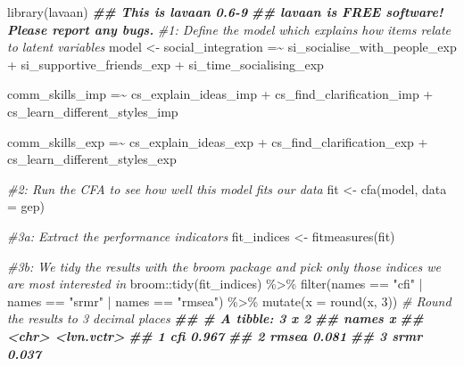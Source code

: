 \documentclass[
]{book}
\newenvironment{Shaded}{\begin{snugshade}}{\end{snugshade}}
\newcommand{\AttributeTok}[1]{\textcolor[rgb]{0.77,0.63,0.00}{#1}}
\newcommand{\CommentTok}[1]{\textcolor[rgb]{0.56,0.35,0.01}{\textit{#1}}}
\newcommand{\DecValTok}[1]{\textcolor[rgb]{0.00,0.00,0.81}{#1}}
\newcommand{\DocumentationTok}[1]{\textcolor[rgb]{0.56,0.35,0.01}{\textbf{\textit{#1}}}}
\newcommand{\FunctionTok}[1]{\textcolor[rgb]{0.00,0.00,0.00}{#1}}
\newcommand{\NormalTok}[1]{#1}
\newcommand{\OtherTok}[1]{\textcolor[rgb]{0.56,0.35,0.01}{#1}}
\newcommand{\SpecialCharTok}[1]{\textcolor[rgb]{0.00,0.00,0.00}{#1}}
\newcommand{\StringTok}[1]{\textcolor[rgb]{0.31,0.60,0.02}{#1}}
\begin{document}
\begin{Shaded}
\begin{Highlighting}[]
\FunctionTok{library}\NormalTok{(lavaan)}
\DocumentationTok{\#\# This is lavaan 0.6{-}9}
\DocumentationTok{\#\# lavaan is FREE software! Please report any bugs.}
\CommentTok{\#1: Define the model which explains how items relate to latent variables}
\NormalTok{model }\OtherTok{\textless{}{-}} \StringTok{\textquotesingle{}}
\StringTok{social\_integration =\textasciitilde{}}
\StringTok{si\_socialise\_with\_people\_exp +}
\StringTok{si\_supportive\_friends\_exp +}
\StringTok{si\_time\_socialising\_exp}

\StringTok{comm\_skills\_imp =\textasciitilde{}}
\StringTok{cs\_explain\_ideas\_imp +}
\StringTok{cs\_find\_clarification\_imp +}
\StringTok{cs\_learn\_different\_styles\_imp}

\StringTok{comm\_skills\_exp =\textasciitilde{}}
\StringTok{cs\_explain\_ideas\_exp +}
\StringTok{cs\_find\_clarification\_exp +}
\StringTok{cs\_learn\_different\_styles\_exp}
\StringTok{\textquotesingle{}}

\CommentTok{\#2: Run the CFA to see how well this model fits our data}
\NormalTok{fit }\OtherTok{\textless{}{-}} \FunctionTok{cfa}\NormalTok{(model, }\AttributeTok{data =}\NormalTok{ gep)}

\CommentTok{\#3a: Extract the performance indicators}
\NormalTok{fit\_indices }\OtherTok{\textless{}{-}} \FunctionTok{fitmeasures}\NormalTok{(fit)}

\CommentTok{\#3b: We tidy the results with the \textquotesingle{}broom\textquotesingle{} package and pick only those indices we are most interested in}
\NormalTok{broom}\SpecialCharTok{::}\FunctionTok{tidy}\NormalTok{(fit\_indices) }\SpecialCharTok{\%\textgreater{}\%}
  \FunctionTok{filter}\NormalTok{(names }\SpecialCharTok{==} \StringTok{"cfi"} \SpecialCharTok{|} 
\NormalTok{         names }\SpecialCharTok{==} \StringTok{"srmr"} \SpecialCharTok{|}
\NormalTok{         names }\SpecialCharTok{==} \StringTok{"rmsea"}\NormalTok{) }\SpecialCharTok{\%\textgreater{}\%} 
  \FunctionTok{mutate}\NormalTok{(}\AttributeTok{x =} \FunctionTok{round}\NormalTok{(x, }\DecValTok{3}\NormalTok{))         }\CommentTok{\# Round the results to 3 decimal places}
\DocumentationTok{\#\# \# A tibble: 3 x 2}
\DocumentationTok{\#\#   names x         }
\DocumentationTok{\#\#   \textless{}chr\textgreater{} \textless{}lvn.vctr\textgreater{}}
\DocumentationTok{\#\# 1 cfi   0.967     }
\DocumentationTok{\#\# 2 rmsea 0.081     }
\DocumentationTok{\#\# 3 srmr  0.037}
\end{Highlighting}
\end{Shaded}
\end{document}
